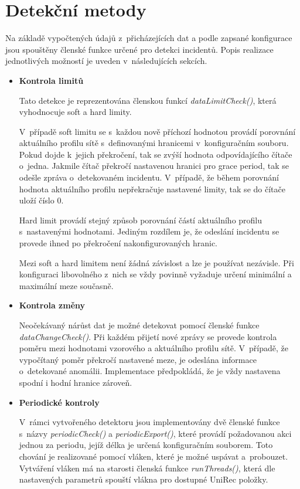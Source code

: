 \section{Detekční metody} \label{detectMethods}
 Na základě vypočtených údajů z~přicházejících dat a podle zapsané konfigurace jsou spouštěny
 členské funkce určené pro detekci incidentů. Popis realizace jednotlivých možností je uveden
 v~následujících sekcích.
 
\begin{itemize}
 \item \textbf{Kontrola limitů}
 
 Tato detekce je reprezentována členskou funkcí \textit{dataLimitCheck()}, která vyhodnocuje
 soft a hard limity. 
 
 V~případě soft limitu se s~každou nově příchozí hodnotou provádí
 porovnání aktuálního profilu sítě s~definovanými hranicemi v~konfiguračním souboru. Pokud dojde
 k~jejich překročení, tak se zvýší hodnota odpovídajícího čítače o~jedna. Jakmile čítač překročí nastavenou 
 hranici pro grace period, tak se odešle zpráva o~detekovaném incidentu. V~případě, že 
 během porovnání hodnota aktuálního profilu nepřekračuje nastavené limity, tak se do čítače uloží 
 číslo 0.
 
 Hard limit provádí stejný způsob porovnání částí aktuálního profilu s~nastavenými hodnotami. Jediným
 rozdílem je, že odeslání incidentu se provede ihned po překročení nakonfigurovaných hranic.
 
 Mezi soft a hard limitem není žádná závislost a lze je používat nezávisle. Při konfiguraci 
 libovolného z~nich se vždy povinně vyžaduje určení minimální a maximální meze současně.
 
 \item \textbf{Kontrola změny}
 
 Neočekávaný nárůst dat je možné detekovat pomocí členské funkce \textit{dataChangeCheck()}.
 Při každém přijetí nové zprávy se provede kontrola poměru mezi hodnotami vzorového a aktuálního
 profilu sítě. V~případě, že vypočítaný poměr překročí nastavené meze, je odeslána informace 
 o~detekované anomálii. Implementace předpokládá, že je vždy nastavena spodní i hodní hranice
 zároveň.
 
 \item \textbf{Periodické kontroly}
 
 V~rámci vytvořeného detektoru jsou implementovány dvě členské funkce s~názvy
 \textit{periodicCheck()} a \textit{periodicExport()}, které provádí požadovanou akci jednou
 za periodu, jejíž délka je určená konfiguračním souborem. Toto chování je realizované pomocí 
 vláken, které je možné uspávat a~probouzet. Vytváření vláken má na starosti členská funkce
 \textit{runThreads()}, která dle nastavených parametrů spouští vlákna pro dostupné UniRec položky.
 

\end{itemize}
